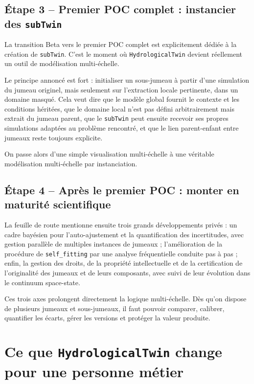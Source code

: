\documentclass[11pt,a4paper]{article}
\newcommand{\hydrot}{\texttt{HydrologicalTwin}}
\begin{document}
\subsection{Étape 3 -- Premier POC complet : instancier des \texttt{subTwin}}

La transition Beta vers le premier POC complet est explicitement dédiée à la création de \texttt{subTwin}. C'est le moment où \hydrot{} devient réellement un outil de modélisation multi-échelle.

Le principe annoncé est fort : initialiser un sous-jumeau à partir d'une simulation du jumeau originel, mais seulement sur l'extraction locale pertinente, dans un domaine masqué. Cela veut dire que le modèle global fournit le contexte et les conditions héritées, que le domaine local n'est pas défini arbitrairement mais extrait du jumeau parent, que le \texttt{subTwin} peut ensuite recevoir ses propres simulations adaptées au problème rencontré, et que le lien parent-enfant entre jumeaux reste toujours explicite.

On passe alors d'une simple visualisation multi-échelle à une véritable modélisation multi-échelle par instanciation.

\subsection{Étape 4 -- Après le premier POC : monter en maturité scientifique}

La feuille de route mentionne ensuite trois grands développements privés : un cadre bayésien pour l'auto-ajustement et la quantification des incertitudes, avec gestion parallèle de multiples instances de jumeaux ; l'amélioration de la procédure de \texttt{self\_fitting} par une analyse fréquentielle conduite pas à pas ; enfin, la gestion des droits, de la propriété intellectuelle et de la certification de l'originalité des jumeaux et de leurs composants, avec suivi de leur évolution dans le continuum space-state.

Ces trois axes prolongent directement la logique multi-échelle. Dès qu'on dispose de plusieurs jumeaux et sous-jumeaux, il faut pouvoir comparer, calibrer, quantifier les écarts, gérer les versions et protéger la valeur produite.

\section{Ce que \hydrot{} change pour une personne métier}
\end{document}
